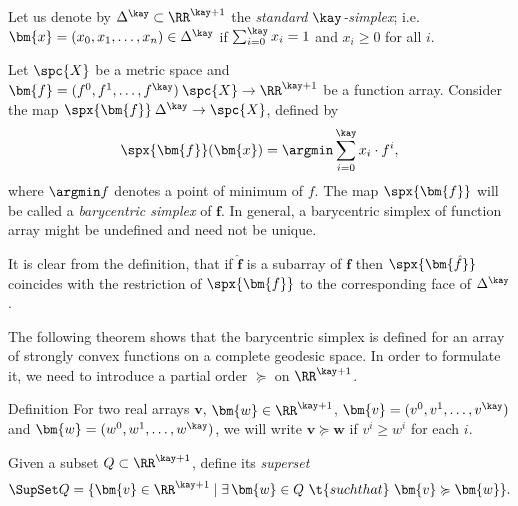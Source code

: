 Let us denote by $\Delta^\kay\subset \RR^{\kay+1}$ 
the \emph{standard $\kay$-simplex}; 
i.e. $\bm{x}=(x_0,x_1,\dots,x_n)\in\Delta^\kay$ if $\sum_{i=0}^\kay x_i=1$ and $x_i\ge0$ for all $i$.

Let $\spc{X}$ be a metric space 
and $\bm{f}=(f^0,f^1,\dots,f^\kay)\:\spc{X}\to \RR^{\kay+1}$ be a function array.
Consider the map $\spx{\bm{f}}\:\Delta^\kay\to \spc{X}$, defined by 
$$\spx{\bm{f}}(\bm{x})=\argmin\sum_{i=0}^\kay x_i\cdot f^i,$$
where $\argmin f$\index{$\argmin$} denotes a point of minimum of $f$.
The map $\spx{\bm{f}}$ will be called a \emph{barycentric simplex} of $\bm{f}$.
In general, a barycentric simplex of function array might be undefined and need not be unique. 

It is clear from the  definition, that if 
$\bm{\hat f}$ is a subarray of $\bm{f}$
then $\spx{\bm{\hat f}}$ coincides with the restriction of $\spx{\bm{f}}$ to the corresponding face of $\Delta^\kay$.

The following theorem shows that the barycentric simplex is defined 
for an array of strongly convex functions on a complete geodesic space. 
In order to formulate it, we need to introduce a partial order $\succcurlyeq$ on $\RR^{\kay+1}$.

\begin{thm}{Definition}\label{def:supset+succcurlyeq}
For two real arrays $\bm{v}$, $\bm{w}\in \RR^{\kay+1}$,
$\bm{v}=(v^0,v^1,\dots,v^\kay)$ 
and 
$\bm{w}=(w^0,w^1,\dots,w^\kay)$, 
we will write
$\bm{v}\succcurlyeq\bm{w}$ if $v^i\ge w^i$ for each $i$.

Given a subset $Q\subset \RR^{\kay+1}$, define its \emph{superset}
\index{$\SupSet$}
$$\SupSet Q =\{\bm{v}\in\RR^{\kay+1}\mid\exists\, \bm{w}\in Q\ \t{such that}\ \bm{v}\succcurlyeq\bm{w}\}.$$

\end{thm}


